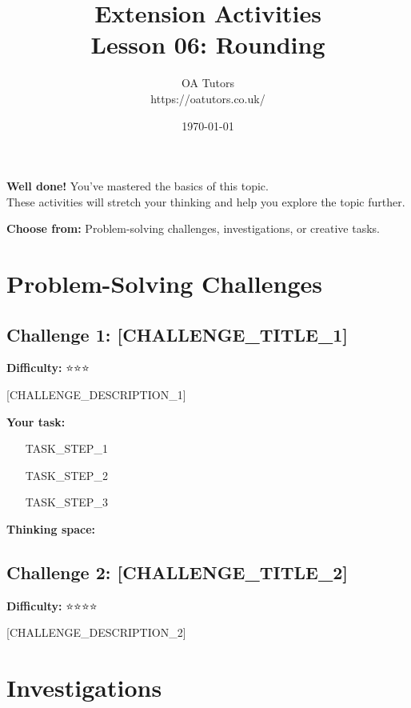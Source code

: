 \documentclass[a4paper,12pt]{article}
\begin{document}
\title{\textcolor{oagreen}{\Huge Extension Activities} \\ 
       \textcolor{oablue}{\Large Lesson 06: Rounding}}
\author{\textcolor{oablue}{OA Tutors} \\ 
        \textcolor{oagray}{https://oatutors.co.uk/}}
\date{\textcolor{oagray}{\today}}

\maketitle

\begin{challenge}
\textbf{Well done!} You've mastered the basics of this topic. \\
These activities will stretch your thinking and help you explore the topic further.

\textbf{Choose from:} Problem-solving challenges, investigations, or creative tasks.
\end{challenge}

\section{Problem-Solving Challenges}

\subsection{Challenge 1: [CHALLENGE_TITLE_1]}
\textbf{Difficulty:} ⭐⭐⭐

[CHALLENGE_DESCRIPTION_1]

\textbf{Your task:}
\begin{enumerate}
    \item [TASK_STEP_1]
    \item [TASK_STEP_2]
    \item [TASK_STEP_3]
\end{enumerate}

\textbf{Thinking space:}

\vspace{4cm}

\subsection{Challenge 2: [CHALLENGE_TITLE_2]}
\textbf{Difficulty:} ⭐⭐⭐⭐

[CHALLENGE_DESCRIPTION_2]

\vspace{4cm}

\section{Investigations}
\end{document}
